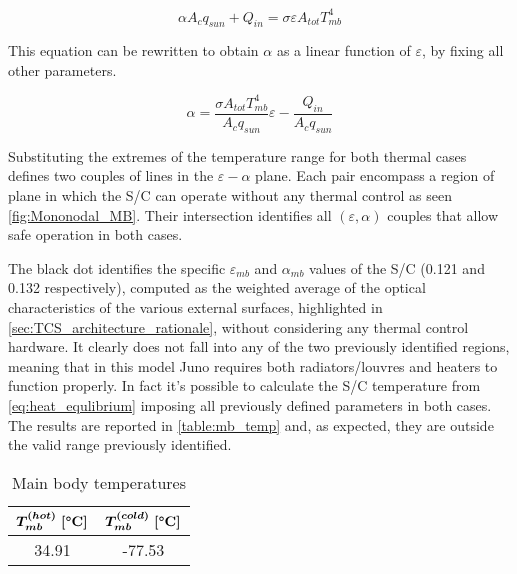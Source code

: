 \begin{equation}
    \alpha A_c q_{sun} + Q_{in} = \sigma \varepsilon A_{tot} T_{mb}^4
    \label{eq:heat_equlibrium}
\end{equation}  

This equation can be rewritten to obtain $\alpha$ as a linear function of $\varepsilon$, by fixing all other parameters.

\begin{equation}
    \alpha = \frac{\sigma A_{tot} T_{mb}^4}{A_c q_{sun}}\varepsilon - \frac{Q_{in}}{A_c q_{sun}}
    \label{eq:eps_alpha_relation}
\end{equation}

Substituting the extremes of the temperature range for both thermal cases defines two couples of lines in the $\varepsilon-\alpha$ plane. Each pair encompass a region of plane in which the S/C can operate without any thermal control as seen \autoref{fig:Mononodal_MB}. Their intersection identifies all $(\varepsilon, \alpha)$ couples that allow safe operation in both cases.


The black dot identifies the specific $\varepsilon_{mb}$ and $\alpha_{mb}$ values of the S/C (0.121 and 0.132 respectively), computed as the weighted average of the optical characteristics of the various external surfaces, highlighted in \autoref{sec:TCS_architecture_rationale}, without considering any thermal control hardware. It clearly does not fall into any of the two previously identified regions, meaning that in this model Juno requires both radiators/louvres and heaters to function properly. In fact it's possible to calculate the S/C temperature from \autoref{eq:heat_equlibrium} imposing all previously defined parameters in both cases. The results are reported in \autoref{table:mb_temp} and, as expected, they are outside the valid range previously identified.

\begin{table}[H]
    \renewcommand{\arraystretch}{1.5}
    \centering
    \begin{tabular}{|c|c|}
        \hline
        $\boldsymbol{T_{mb}^{(hot)} \; [\textrm{\textbf{°C}}]}$ & $\boldsymbol{T_{mb}^{(cold)} \; [\textrm{\textbf{°C}}]}$ \\
        \hline
        34.91 & -77.53 \\
        \hline
    \end{tabular}
    \caption{Main body temperatures}
    \label{table:mb_temp}
\end{table}

